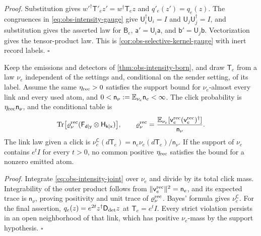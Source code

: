 \noindent\emph{Proof.}
Substitution gives $w'^{\dagger}\mathsf T'_ez'=w^{\dagger}\mathsf T_ez$
and $q'_e(z')=q_e(z)$. The congruences in
\eqref{eq:obs-intensity-gauge} give $\mathsf U_i^{\dagger}\mathsf U_i=I$
and $\mathsf U_j\mathsf U_j^{\dagger}=I$, and substitution gives the asserted
law for $\mathsf B_e$, $\mathsf a'=\mathsf U_i\mathsf a$, and
$\mathsf b'=\mathsf U_j\mathsf b$. Vectorization gives the tensor-product
law. This is \cref{cor:obs-selective-kernel-gauge} with inert record labels.
$\square$

Keep the emissions and detectors of \cref{thm:obs-intensity-born}, and draw
$\mathsf T_e$ from a law $\nu_e$ independent of the settings and, conditional
on the sender setting, of its label. Assume the same $\eta_{\rm rec}>0$
satisfies the support bound for $\nu_e$-almost every link and every used atom,
and $0<\mathsf n_{\nu}:=\mathbb E_{\nu_e}\mathsf n_e<\infty$. The click probability
is $\eta_{\rm rec}\mathsf n_{\nu}$, and the conditional table is
\begin{equation}
\operatorname{Tr}\bigl[\varrho_{\nu}^{\rm rec}
(\mathsf F_{\mathsf d\mid\mathsf y}\otimes\mathsf H_{\mathsf k\mid\mathsf x})\bigr],
\qquad
\varrho_{\nu}^{\rm rec}=
\frac{\mathbb E_{\nu_e}[\mathsf v_e^{\rm rec}(\mathsf v_e^{\rm rec})^{\dagger}]}
{\mathsf n_{\nu}}.
\label{eq:obs-intensity-random-state}
\end{equation}
The link law given a click is
$\nu_e^{\mathsf C}(d\mathsf T_e)=\mathsf n_e\nu_e(d\mathsf T_e)/\mathsf n_{\nu}$.
If the support of $\nu_e$ contains $e^tI$ for every $t>0$, no common positive
$\eta_{\rm rec}$ satisfies the bound for a nonzero emitted atom.

\noindent\emph{Proof.}
Integrate \eqref{eq:obs-intensity-joint} over $\nu_e$ and divide by its
total click mass. Integrability of the outer product follows from
$\|\mathsf v_e^{\rm rec}\|^2=\mathsf n_e$, and its expected trace is
$\mathsf n_{\nu}$, proving positivity and unit trace of
$\varrho_{\nu}^{\rm rec}$. Bayes' formula gives $\nu_e^{\mathsf C}$.
For the final assertion, $q_e(z)=e^{2t}z^{\dagger}\mathsf D_{\rm det}z$
at $\mathsf T_e=e^tI$. Every strict violation persists in an open neighborhood
of that link, which has positive $\nu_e$-mass by the support hypothesis.
$\square$

